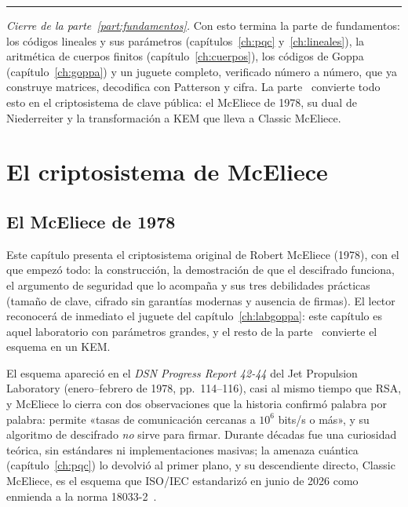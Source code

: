 \documentclass[11pt,a4paper,oneside]{report}
\begin{document}
\begin{center}\rule{0.55\textwidth}{0.4pt}\end{center}
\medskip
\noindent\textit{Cierre de la parte~\ref{part:fundamentos}.} Con esto
termina la parte de fundamentos: los códigos lineales y sus parámetros
(capítulos~\ref{ch:pqc} y~\ref{ch:lineales}), la aritmética de cuerpos
finitos (capítulo~\ref{ch:cuerpos}), los códigos de Goppa
(capítulo~\ref{ch:goppa}) y un juguete completo, verificado número a
número, que ya construye matrices, decodifica con Patterson y cifra. La
parte~\ref{part:mceliece} convierte todo esto en el criptosistema de
clave pública: el McEliece de 1978, su dual de Niederreiter y la
transformación a KEM que lleva a Classic McEliece.

\clearpage

\part{El criptosistema de McEliece}\label{part:mceliece}

\chapter{El McEliece de 1978}\label{ch:1978}

\begin{roadmap}
Este capítulo presenta el criptosistema original de Robert McEliece
(1978), con el que empezó todo: la construcción, la demostración de que
el descifrado funciona, el argumento de seguridad que lo acompaña y sus
tres debilidades prácticas (tamaño de clave, cifrado sin garantías
modernas y ausencia de firmas). El lector reconocerá de inmediato el
juguete del capítulo~\ref{ch:labgoppa}: este capítulo es aquel
laboratorio con parámetros grandes, y el resto de la
parte~\ref{part:mceliece} convierte el esquema en un KEM.
\end{roadmap}

\begin{historia}
El esquema apareció en el \emph{DSN Progress Report 42-44} del Jet
Propulsion Laboratory (enero--febrero de 1978, pp.~114--116), casi al
mismo tiempo que RSA, y McEliece lo cierra con dos observaciones que la
historia confirmó palabra por palabra: permite «tasas de comunicación
cercanas a $10^6$ bits/s o más», y su algoritmo de descifrado \emph{no}
sirve para firmar. Durante décadas fue una curiosidad teórica, sin
estándares ni implementaciones masivas; la amenaza cuántica
(capítulo~\ref{ch:pqc}) lo devolvió al primer plano, y su descendiente
directo, Classic McEliece, es el esquema que ISO/IEC estandarizó en
junio de 2026 como enmienda a la norma 18033-2~\cite{iso18033,cmiso}.
\end{historia}
\end{document}
